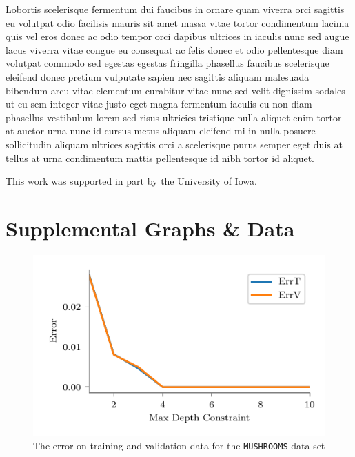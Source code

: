 \documentclass[screen, authorversion, nonacm, sigconf]{acmart}
\begin{document}
Lobortis scelerisque fermentum dui faucibus in ornare quam viverra orci sagittis eu volutpat odio facilisis mauris sit amet massa vitae tortor condimentum lacinia quis vel eros donec ac odio tempor orci dapibus ultrices in iaculis nunc sed augue lacus viverra vitae congue eu consequat ac felis donec et odio pellentesque diam volutpat commodo sed egestas egestas fringilla phasellus faucibus scelerisque eleifend donec pretium vulputate sapien nec sagittis aliquam malesuada bibendum arcu vitae elementum curabitur vitae nunc sed velit dignissim sodales ut eu sem integer vitae justo eget magna fermentum iaculis eu non diam phasellus vestibulum lorem sed risus ultricies tristique nulla aliquet enim tortor at auctor urna nunc id cursus metus aliquam eleifend mi in nulla posuere sollicitudin aliquam ultrices sagittis orci a scelerisque purus semper eget duis at tellus at urna condimentum mattis pellentesque id nibh tortor id aliquet.

\begin{acks}
This work was supported in part by the University of Iowa.
\end{acks}




\appendix

\section{Supplemental Graphs \& Data}

\begin{figure}[H]
  \centering
  \includegraphics[width=\columnwidth]{figures/chart_errt_errv_mushrooms_ours.pdf}
  \caption{The error on training and validation data for the \texttt{MUSHROOMS} data set}
  \label{fig:mushroomserrterrv}
\end{figure}
\end{document}
